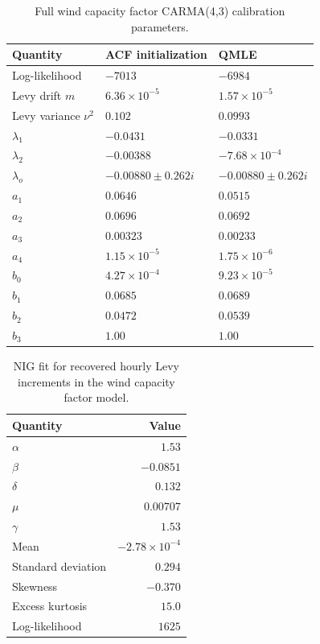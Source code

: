 \begin{table}[H]
  \centering
  \caption{Full wind capacity factor CARMA(4,3) calibration parameters.}
  \label{tab:app-wind-carma-params}
  \small
  \begin{tabular}{@{}lll@{}}
    \toprule
    Quantity & ACF initialization & QMLE \\
    \midrule
    Log-likelihood & \(-7013\) & \(-6984\) \\
    Levy drift \(m\) & \(6.36{\times}10^{-5}\) & \(1.57{\times}10^{-5}\) \\
    Levy variance \(\nu^2\) & \(0.102\) & \(0.0993\) \\
    \midrule
    \(\lambda_1\) & \(-0.0431\) & \(-0.0331\) \\
    \(\lambda_2\) & \(-0.00388\) & \(-7.68{\times}10^{-4}\) \\
    \(\lambda_o\) & \(-0.00880\pm0.262i\) & \(-0.00880\pm0.262i\) \\
    \midrule
    \(a_1\) & \(0.0646\) & \(0.0515\) \\
    \(a_2\) & \(0.0696\) & \(0.0692\) \\
    \(a_3\) & \(0.00323\) & \(0.00233\) \\
    \(a_4\) & \(1.15{\times}10^{-5}\) & \(1.75{\times}10^{-6}\) \\
    \midrule
    \(b_0\) & \(4.27{\times}10^{-4}\) & \(9.23{\times}10^{-5}\) \\
    \(b_1\) & \(0.0685\) & \(0.0689\) \\
    \(b_2\) & \(0.0472\) & \(0.0539\) \\
    \(b_3\) & \(1.00\) & \(1.00\) \\
    \bottomrule
  \end{tabular}
\end{table}



\begin{table}[H]
  \centering
  \caption{NIG fit for recovered hourly Levy increments in the wind capacity factor model.}
  \label{tab:app-wind-nig-params}
  \small
  \begin{tabular}{@{}lr@{}}
    \toprule
    Quantity & Value \\
    \midrule
    \(\alpha\) & \(1.53\) \\
    \(\beta\) & \(-0.0851\) \\
    \(\delta\) & \(0.132\) \\
    \(\mu\) & \(0.00707\) \\
    \(\gamma\) & \(1.53\) \\
    Mean & \(-2.78{\times}10^{-4}\) \\
    Standard deviation & \(0.294\) \\
    Skewness & \(-0.370\) \\
    Excess kurtosis & \(15.0\) \\
    Log-likelihood & \(1625\) \\
    \bottomrule
  \end{tabular}
\end{table}



